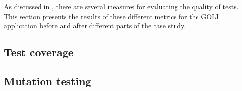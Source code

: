 
As discussed in , there are several measures for
evaluating the quality of tests. This section presents the results of
these different metrics for the GOLI application before and after
different parts of the case study.\\


\subsection{Test coverage}
    

\subsection{Mutation testing}
    
